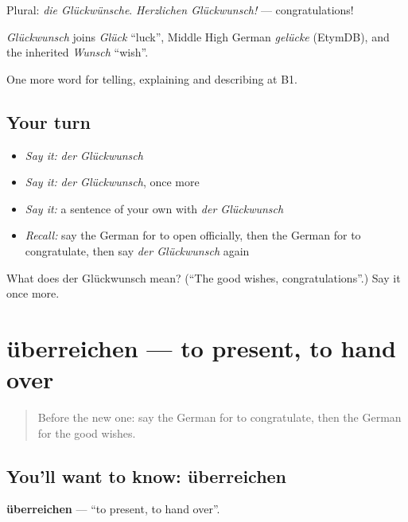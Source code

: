 Plural: \emph{die Glückwünsche}. \emph{Herzlichen Glückwunsch!} — congratulations!

\begin{cousinweb}
\emph{Glückwunsch} joins \emph{Glück} \textquotedblleft{}luck\textquotedblright{}, Middle High German \emph{gelücke} (EtymDB), and the inherited \emph{Wunsch} \textquotedblleft{}wish\textquotedblright{}.
\end{cousinweb}

\begin{grammarlens}[title={What you've built}]
One more word for telling, explaining and describing at B1.
\end{grammarlens}

\subsection*{Your turn}
\begin{itemize}
\raggedright
  \item \emph{Say it:} \emph{der Glückwunsch}
  \item \emph{Say it:} \emph{der Glückwunsch}, once more
  \item \emph{Say it:} a sentence of your own with \emph{der Glückwunsch}
  \item \emph{Recall:} say the German for to open officially, then the German for to congratulate, then say \emph{der Glückwunsch} again
\end{itemize}

\begin{tcolorbox}[breakable,colback=teal!4,colframe=teal!35!black,title={Before you move on}]
What does der Glückwunsch mean? (\textquotedblleft{}The good wishes, congratulations\textquotedblright{}.) Say it once more.
\end{tcolorbox}
\section[überreichen]{überreichen — to present, to hand over}

\label{lesson:GE-C306-ueberreichen}



\begin{quote}
Before the new one: say the German for to congratulate, then the German for the good wishes.
\end{quote}

\subsection*{You'll want to know: überreichen}
\textbf{überreichen} — \textquotedblleft{}to present, to hand over\textquotedblright{}.


